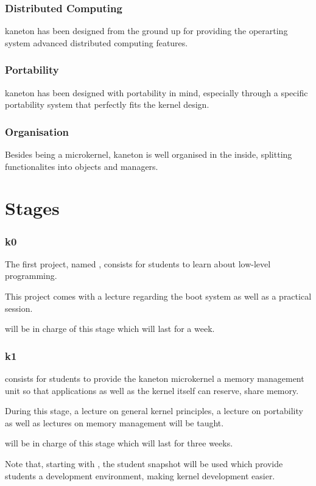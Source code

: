 
\begin{frame}
  \frametitle{Distributed Computing}

  kaneton has been designed from the ground up for providing the operarting
  system advanced distributed computing features.
\end{frame}


\begin{frame}
  \frametitle{Portability}

  kaneton has been designed with portability in mind, especially through
  a specific portability system that perfectly fits the kernel design.
\end{frame}


\begin{frame}
  \frametitle{Organisation}

  Besides being a microkernel, kaneton is well organised in the inside,
  splitting functionalites into objects and managers.
\end{frame}

%
%

\section{Stages}


\begin{frame}
  \frametitle{k0}

  The first project, named , consists for students to learn
  about low-level programming.

  \-

  This project comes with a lecture regarding the boot system as well
  as a practical session.

  \-

   will be in charge of this stage which will last for
  a week.
\end{frame}


\begin{frame}
  \frametitle{k1}

   consists for students to provide the kaneton microkernel a
  memory management unit so that applications as well as the kernel itself
  can reserve, share \etc{} memory.

  \-

  During this stage, a lecture on general kernel principles, a lecture on
  portability as well as lectures on memory management will be taught.

  \-

   will be in charge of this stage which will last
  for three weeks.

  \-

  Note that, starting with , the student snapshot will be used which
  provide students a development environment, making kernel development easier.
\end{frame}

